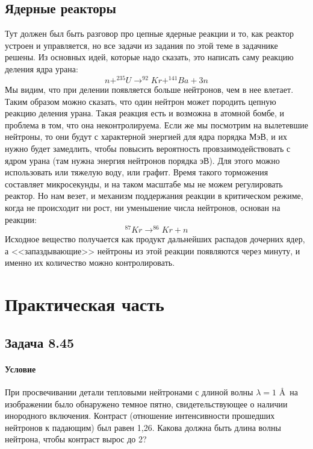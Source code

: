 \documentclass[12pt]{article}
\begin{document}
\subsection{Ядерные реакторы}
Тут должен был быть разговор про цепные ядерные реакции и то, как реактор устроен и управляется, но все задачи из задания по этой теме в задачнике решены. Из основных идей, которые надо сказать, это написать саму реакцию деления ядра урана:
\begin{equation*}
    n + ^{235}U \rightarrow ^{92}Kr + ^{141}Ba + 3n
\end{equation*}
Мы видим, что при делении появляется больше нейтронов, чем в нее влетает. Таким образом можно сказать, что один нейтрон может породить цепную реакцию деления урана. Такая реакция есть и возможна в атомной бомбе, и проблема в том, что она неконтролируема. Если же мы посмотрим на вылетевшие нейтроны, то они будут с характерной энергией для ядра порядка МэВ, и их нужно будет замедлить, чтобы повысить вероятность провзаимодействовать с ядром урана (там нужна энергия нейтронов порядка эВ). Для этого можно использовать или тяжелую воду, или графит. Время такого торможения составляет микросекунды, и на таком масштабе мы не можем регулировать реактор. Но нам везет, и механизм поддержания реакции в критическом режиме, когда не происходит ни рост, ни уменьшение числа нейтронов, основан на реакции:
\begin{equation*}
    ^{87}Kr \rightarrow ^{86}Kr + n
\end{equation*}
Исходное вещество получается как продукт дальнейших распадов дочерних ядер, а <<запаздывающие>> нейтроны из этой реакции появляются через минуту, и именно их количество можно контролировать.

\section{Практическая часть}
\subsection{Задача 8.45}
\label{task_}
\paragraph{Условие}
При просвечивании детали тепловыми нейтронами с длиной волны $\lambda = 1$ \AA \, на изображении было обнаружено темное пятно, свидетельствующее о наличии инородного включения. Контраст (отношение интенсивности прошедших нейтронов к падающим) был равен 1,26. Какова должна быть длина волны нейтрона, чтобы контраст вырос до 2?
\end{document}
